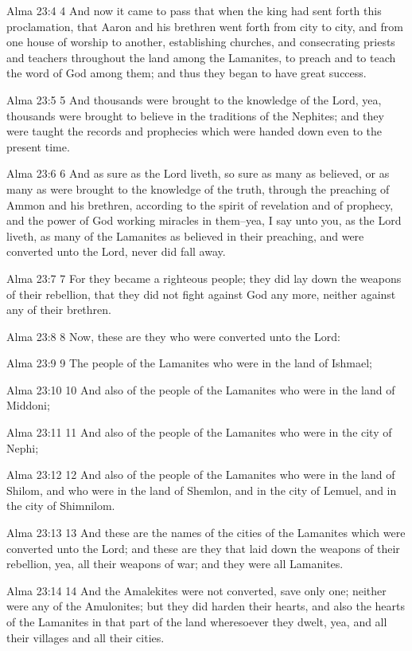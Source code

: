 Alma 23:4
 4 And now it came to pass that when the king had sent forth this
proclamation, that Aaron and his brethren went forth from city to
city, and from one house of worship to another, establishing
churches, and consecrating priests and teachers throughout the
land among the Lamanites, to preach and to teach the word of God
among them; and thus they began to have great success.

Alma 23:5
 5 And thousands were brought to the knowledge of the Lord, yea,
thousands were brought to believe in the traditions of the
Nephites; and they were taught the records and prophecies which
were handed down even to the present time.

Alma 23:6
 6 And as sure as the Lord liveth, so sure as many as believed,
or as many as were brought to the knowledge of the truth, through
the preaching of Ammon and his brethren, according to the spirit
of revelation and of prophecy, and the power of God working
miracles in them--yea, I say unto you, as the Lord liveth, as
many of the Lamanites as believed in their preaching, and were
converted unto the Lord, never did fall away.

Alma 23:7
 7 For they became a righteous people; they did lay down the
weapons of their rebellion, that they did not fight against God
any more, neither against any of their brethren.

Alma 23:8
 8 Now, these are they who were converted unto the Lord:

Alma 23:9
 9 The people of the Lamanites who were in the land of Ishmael;

Alma 23:10
 10 And also of the people of the Lamanites who were in the land
of Middoni;

Alma 23:11
 11 And also of the people of the Lamanites who were in the city
of Nephi;

Alma 23:12
 12 And also of the people of the Lamanites who were in the land
of Shilom, and who were in the land of Shemlon, and in the city
of Lemuel, and in the city of Shimnilom.

Alma 23:13
 13 And these are the names of the cities of the Lamanites which
were converted unto the Lord; and these are they that laid down
the weapons of their rebellion, yea, all their weapons of war;
and they were all Lamanites.

Alma 23:14
 14 And the Amalekites were not converted, save only one; neither
were any of the Amulonites; but they did harden their hearts, and
also the hearts of the Lamanites in that part of the land
wheresoever they dwelt, yea, and all their villages and all their
cities.

